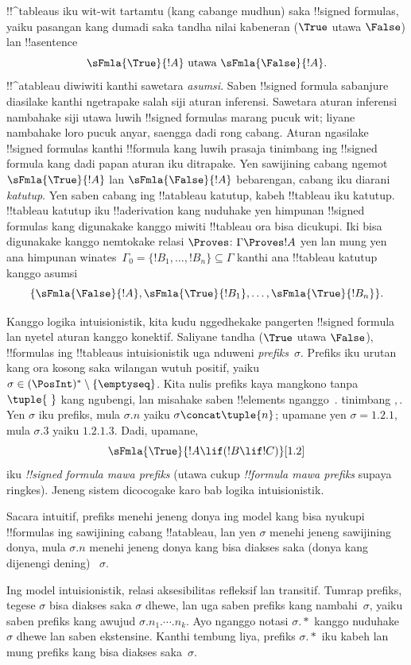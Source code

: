 \documentclass[../../../include/open-logic-section]{subfiles}
\begin{document}


!!^{tableau}s iku wit-wit tartamtu (kang cabange mudhun) saka !!{signed
  formula}s, yaiku pasangan kang dumadi saka tandha nilai kabeneran
($\True$ utawa $\False$) lan !!a{sentence}
\[
\sFmla{\True}{!A} \text{ utawa } \sFmla{\False}{!A}.
\]
!!^a{tableau} diwiwiti kanthi sawetara \emph{asumsi}. Saben
!!{signed formula} sabanjure diasilake kanthi ngetrapake salah siji
aturan inferensi. Sawetara aturan inferensi nambahake siji utawa
luwih !!{signed formula}s marang pucuk wit; liyane nambahake loro
pucuk anyar, saengga dadi rong cabang. Aturan ngasilake
!!{signed formula}s kanthi !!{formula} kang luwih prasaja tinimbang
ing !!{signed formula} kang dadi papan aturan iku ditrapake.
Yen sawijining cabang ngemot $\sFmla{\True}{!A}$ lan
$\sFmla{\False}{!A}$ bebarengan, cabang iku diarani \emph{katutup}.
Yen saben cabang ing !!a{tableau} katutup, kabeh !!{tableau} iku
katutup. !!{tableau} katutup iku !!a{derivation} kang nuduhake yen
himpunan !!{signed formula}s kang digunakake kanggo miwiti
!!{tableau} ora bisa dicukupi. Iki bisa digunakake kanggo nemtokake
relasi $\Proves$: $\Gamma \Proves !A$ yen lan mung yen ana himpunan
winates~$\Gamma_0 = \{!B_1, \dots, !B_n\} \subseteq \Gamma$ kanthi
ana !!{tableau} katutup kanggo asumsi
\[
\{\sFmla{\False}{!A}, \sFmla{\True}{!B_1}, \dots, \sFmla{\True}{!B_n}\}.
\]

Kanggo logika intuisionistik, kita kudu nggedhekake pangerten
!!{signed formula} lan nyetel aturan kanggo konektif. Saliyane
tandha ($\True$ utawa $\False$), !!{formula}s ing !!{tableau}s
intuisionistik uga nduweni \emph{prefiks}~$\sigma$. Prefiks iku
urutan kang ora kosong saka wilangan wutuh positif, yaiku
$\sigma \in (\PosInt)^* \setminus \{\emptyseq\}$.
Kita nulis prefiks kaya mangkono tanpa $\tuple{\ }$ kang ngubengi,
lan misahake saben !!{element}s nganggo~$.$ tinimbang $,$.
Yen $\sigma$ iku prefiks, mula $\sigma.n$ yaiku
$\sigma \concat \tuple{n}$; upamane yen $\sigma = 1.2.1$,
mula $\sigma.3$ yaiku $1.2.1.3$. Dadi, upamane,
\[
\sFmla{\True}{!A \lif (!B \lif !C)}[1.2]
\]
iku \emph{!!{signed formula} mawa prefiks} (utawa cukup
\emph{!!{formula} mawa prefiks} supaya ringkes).
Jeneng sistem dicocogake karo bab logika intuisionistik.

Sacara intuitif, prefiks menehi jeneng donya ing model kang bisa
nyukupi !!{formula}s ing sawijining cabang !!a{tableau}, lan yen
$\sigma$ menehi jeneng sawijining donya, mula $\sigma.n$ menehi
jeneng donya kang bisa diakses saka (donya kang dijenengi dening)
~$\sigma$.

Ing model intuisionistik, relasi aksesibilitas refleksif lan transitif.
Tumrap prefiks, tegese $\sigma$ bisa diakses saka $\sigma$ dhewe,
lan uga saben prefiks kang nambahi~$\sigma$, yaiku saben prefiks
kang awujud $\sigma.n_1.\cdots.n_k$. Ayo nganggo notasi $\sigma.*$
kanggo nuduhake $\sigma$ dhewe lan saben ekstensine. Kanthi tembung
liya, prefiks $\sigma.*$ iku kabeh lan mung prefiks kang bisa
diakses saka~$\sigma$.
\end{document}
